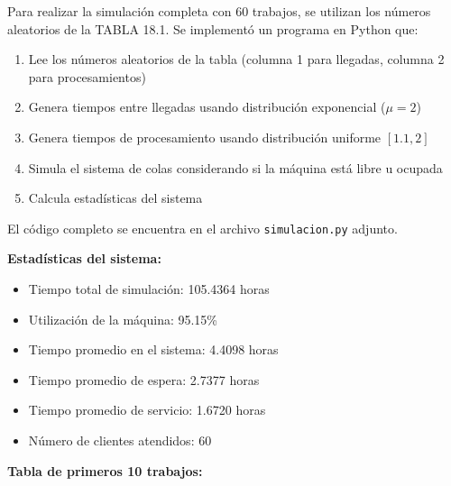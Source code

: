 \documentclass{article}
\begin{document}
Para realizar la simulación completa con 60 trabajos, se utilizan los números aleatorios de la TABLA 18.1. Se implementó un programa en Python que:

\begin{enumerate}
    \item Lee los números aleatorios de la tabla (columna 1 para llegadas, columna 2 para procesamientos)
    \item Genera tiempos entre llegadas usando distribución exponencial ($\mu = 2$)
    \item Genera tiempos de procesamiento usando distribución uniforme $[1.1, 2]$
    \item Simula el sistema de colas considerando si la máquina está libre u ocupada
    \item Calcula estadísticas del sistema
\end{enumerate}

\vspace{0.3cm}
El código completo se encuentra en el archivo \texttt{simulacion.py} adjunto.

\vspace{0.5cm}
\textbf{Estadísticas del sistema:}
\begin{itemize}
    \item Tiempo total de simulación: 105.4364 horas
    \item Utilización de la máquina: 95.15\%
    \item Tiempo promedio en el sistema: 4.4098 horas
    \item Tiempo promedio de espera: 2.7377 horas
    \item Tiempo promedio de servicio: 1.6720 horas
    \item Número de clientes atendidos: 60
\end{itemize}

\vspace{0.5cm}
\textbf{Tabla de primeros 10 trabajos:}
\end{document}
